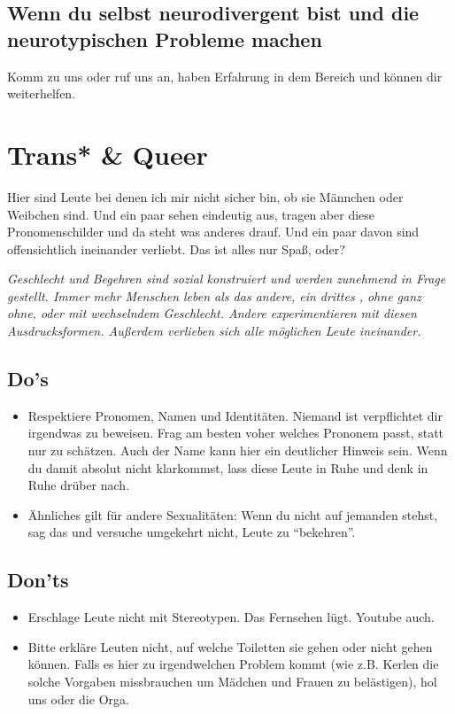 \documentclass[10pt]{leaflet}
\begin{document}
\subsection{Wenn du selbst neurodivergent bist und die neurotypischen Probleme machen}
Komm zu uns oder ruf uns an, haben Erfahrung in dem
Bereich und können dir weiterhelfen.

\section{Trans* \& Queer}
\label{sec-5}
Hier sind Leute bei denen ich mir nicht sicher bin, ob sie Männchen
oder Weibchen sind. Und ein paar sehen eindeutig aus, tragen aber
diese Pronomenschilder und da steht was anderes drauf. Und ein paar
davon sind offensichtlich ineinander verliebt. Das ist alles nur Spaß,
oder?

\emph{Geschlecht und Begehren sind sozial konstruiert und werden
  zunehmend in Frage gestellt. Immer mehr Menschen leben als das
  andere, ein drittes , ohne ganz ohne, oder mit wechselndem
  Geschlecht. Andere experimentieren mit diesen
  Ausdrucksformen. Außerdem verlieben sich alle möglichen Leute
  ineinander.}
\subsection{Do's}
\label{sec-5-1}
\begin{itemize}
\item Respektiere Pronomen, Namen und Identitäten. Niemand ist
  verpflichtet dir irgendwas zu beweisen. Frag am besten voher welches
  Prononem passt, statt nur zu schätzen. Auch der Name kann hier ein
  deutlicher Hinweis sein. Wenn du damit absolut nicht klarkommst,
  lass diese Leute in Ruhe und denk in Ruhe drüber nach.
\item Ähnliches gilt für andere Sexualitäten: Wenn du nicht auf
  jemanden stehst, sag das und versuche umgekehrt nicht, Leute zu
  ``bekehren''.
\end{itemize}
\subsection{Don'ts}
\label{sec-5-2}
\begin{itemize}
\item Erschlage Leute nicht mit Stereotypen. Das Fernsehen
  lügt. Youtube auch.
\item Bitte erkläre Leuten nicht, auf welche Toiletten sie gehen oder
  nicht gehen können. Falls es hier zu irgendwelchen Problem kommt
  (wie z.B. Kerlen die solche Vorgaben missbrauchen um Mädchen und Frauen
  zu belästigen), hol uns oder die Orga.
\end{itemize}
\end{document}
